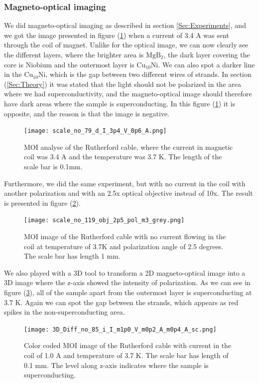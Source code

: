 \documentclass{comjnl}
\newcommand*\chem[1]{\ensuremath{\mathrm{#1}}}
\begin{document}
\subsubsection{Magneto-optical imaging}
We did magneto-optical imaging as described in section \ref{Sec:Experiments}, and we got the image presented in figure (\ref{fig:moi2d1}) when a current of 3.4 A was sent through the coil of magnet. Unlike for the optical image, we can now clearly see the different layers, where the brighter area is \chem{MgB_2}, the dark layer covering the core is Niobium and the outermost layer is \chem{Cu_{10}Ni}. We can also spot a darker line in the \chem{Cu_{10}Ni}, which is the gap between two different wires of strands. In section (\ref{Sec:Theory}) it was stated that the light should not be polarized in the area where we had superconductivity, and the magneto-optical image should therefore have dark areas where the sample is superconducting. In this figure (\ref{fig:moi2d1}) it is opposite, and the reason is that the image is negative. 
\begin{figure}[h]
\centering
\texttt{[image: scale\_no\_79\_d\_I\_3p4\_V\_0p6\_A.png]}
\caption{MOI analyse of the Rutherford cable, where the current in magnetic coil was 3.4 A and the temperature was 3.7 K. The length of the scale bar is 0.1mm. \label{fig:moi2d1}}
\end{figure}

Furthermore, we did the same experiment, but with no current in the coil with another polarization and with an 2.5x optical objective instead of 10x. The result is presented in figure (\ref{fig:moi2d2}). 
\begin{figure}[h]
\centering
\texttt{[image: scale\_no\_119\_obj\_2p5\_pol\_m3\_grey.png]}
\caption{MOI image of the Rutherford cable with no current flowing in the coil at temperature of 3.7K and polarization angle of 2.5 degrees. The scale bar has length 1 mm. \label{fig:moi2d2}}
\end{figure}

We also played with a 3D tool to transform a 2D magneto-optical image into a 3D image where the z-axis showed the intensity of polarization. As we can see in figure (\ref{fig:moi3d}), all of the sample apart from the outermost layer is superconducting at 3.7 K. Again we can spot the gap between the strands, which appears as red spikes in the non-superconducting area. 
\begin{figure}[h]
\centering
\texttt{[image: 3D\_Diff\_no\_85\_i\_I\_m1p0\_V\_m0p2\_A\_m0p4\_A\_sc.png]}
\caption{Color coded MOI image of the Rutherford cable with current in the coil of 1.0 A and temperature of 3.7 K. The scale bar has length of 0.1 mm. The level along z-axis indicates where the sample is superconducting.\label{fig:moi3d}}
\end{figure}
\end{document}
